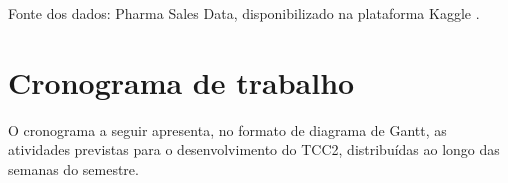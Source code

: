 \documentclass[
    12pt,                %
    openright,           %
    oneside,             %
    a4paper,             %
    english,             %
    brazil               %
]{abntex2}
\begin{document}
Fonte dos dados: Pharma Sales Data, disponibilizado na plataforma Kaggle \cite{Zdravkovic2020}.

\section{Cronograma de trabalho}
\label{sec:cronograma}

O cronograma a seguir apresenta, no formato de diagrama de Gantt, as atividades previstas para o desenvolvimento do TCC2, distribuídas ao longo das semanas do semestre.

\end{document}
